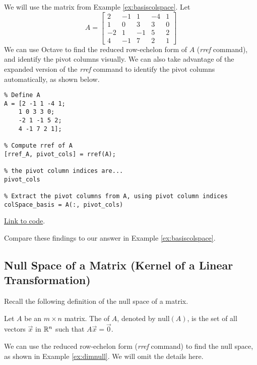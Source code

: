 \documentclass{ximera}
\begin{document}
\begin{template}\label{temp:colSpace}
We will use the matrix from Example \ref{ex:basiscolspace}.  Let $$A=\begin{bmatrix}2&-1&1&-4&1\\1&0&3&3&0\\-2&1&-1&5&2\\4&-1&7&2&1\end{bmatrix}$$
We can use Octave to find the reduced row-echelon form of $A$ (\emph{rref} command), and identify the pivot columns visually.  We can also take advantage of the expanded version of the \emph{rref} command to identify the pivot columns automatically, as shown below.

\begin{verbatim}
% Define A
A = [2 -1 1 -4 1;
    1 0 3 3 0;
    -2 1 -1 5 2;
    4 -1 7 2 1];

% Compute rref of A
[rref_A, pivot_cols] = rref(A);

% the pivot column indices are...
pivot_cols

% Extract the pivot columns from A, using pivot column indices
colSpace_basis = A(:, pivot_cols)
\end{verbatim}

\href{https://sagecell.sagemath.org/?z=eJxtTkEKwjAQvAfyh7kULNhiqiIoHoL6Ao9SSq2JBmxTklR8vhssKOjuZWeGmdkEe6VNpyA5k9jiVCATEMgWEBvOQCMww5x2NuKsiLrAEsXILCJcgfiSGM4S7GzbD0HBOaVhdUw_xbuSU_TmYUPV2LsvqTCyE5mOvnBTbx2kD20H011Mozxqp_I85-xjfhsOz-DqJvwYPbSzLahu8Ka7_g3ljPCxrxtVnWtvPH0jJ-vvB9MX3FlRVA==&lang=octave&interacts=eJyLjgUAARUAuQ==}{Link to code}.

Compare these findings to our answer in Example \ref{ex:basiscolspace}.
\end{template}  

\subsection*{Null Space of a Matrix (Kernel of a Linear Transformation)}

Recall the following definition of the null space of a matrix.
\begin{definition}[\ref{def:nullspace}] Let $A$ be an $m\times n$ matrix.  The  of $A$, denoted by $\mbox{null}(A)$, is the set of all vectors $\vec{x}$ in $\mathbb{R}^n$ such that $A\vec{x}=\vec{0}$.
\end{definition}

We can use the reduced row-echelon form (\emph{rref} command) to find the null space, as shown in Example \ref{ex:dimnull}.  We will omit the details here.
\end{document}
